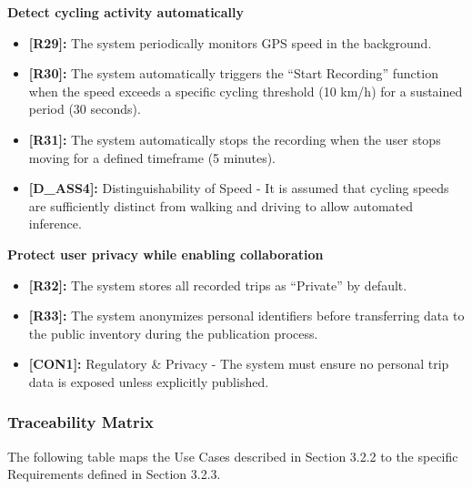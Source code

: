 \begin{enumerate}[label=\textbf{-[G\arabic*]}:]
    \item \textbf{Detect cycling activity automatically}
    \begin{itemize}
        \item \textbf{[R29]:} The system periodically monitors GPS speed in the background.
        \item \textbf{[R30]:} The system automatically triggers the ``Start Recording'' function when the speed exceeds a specific cycling threshold (10 km/h) for a sustained period (30 seconds).
        \item \textbf{[R31]:} The system automatically stops the recording when the user stops moving for a defined timeframe (5 minutes).
        \item \textbf{[D\_ASS4]:} Distinguishability of Speed - It is assumed that cycling speeds are sufficiently distinct from walking and driving to allow automated inference.
    \end{itemize}

    \item \textbf{Protect user privacy while enabling collaboration}
    \begin{itemize}
        \item \textbf{[R32]:} The system stores all recorded trips as ``Private'' by default.
        \item \textbf{[R33]:} The system anonymizes personal identifiers before transferring data to the public inventory during the publication process.
        \item \textbf{[CON1]:} Regulatory \& Privacy - The system must ensure no personal trip data is exposed unless explicitly published.
    \end{itemize}

\end{enumerate}

\subsubsection{Traceability Matrix}
The following table maps the Use Cases described in Section 3.2.2 to the specific Requirements defined in Section 3.2.3.

